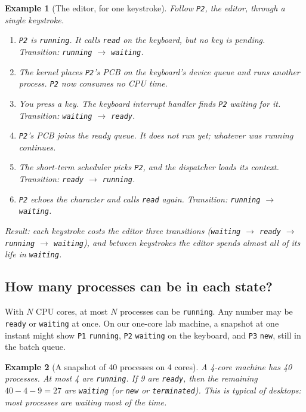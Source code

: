\documentclass[11pt]{article}
\newtheorem{example}{Example}
\begin{document}
\begin{example}[The editor, for one keystroke]
\label{ex:keystroke}
Follow \texttt{P2}, the editor, through a single keystroke.
\begin{enumerate}
  \item \texttt{P2} is \texttt{running}. It calls \texttt{read} on the
        keyboard, but no key is pending. Transition:
        \texttt{running} $\to$ \texttt{waiting}.
  \item The kernel places \texttt{P2}'s PCB on the keyboard's device queue and
        runs another process. \texttt{P2} now consumes no CPU time.
  \item You press a key. The keyboard interrupt handler finds \texttt{P2}
        waiting for it. Transition: \texttt{waiting} $\to$ \texttt{ready}.
  \item \texttt{P2}'s PCB joins the ready queue. It does \emph{not} run yet;
        whatever was running continues.
  \item The short-term scheduler picks \texttt{P2}, and the dispatcher loads
        its context. Transition: \texttt{ready} $\to$ \texttt{running}.
  \item \texttt{P2} echoes the character and calls \texttt{read} again.
        Transition: \texttt{running} $\to$ \texttt{waiting}.
\end{enumerate}
\emph{Result:} each keystroke costs the editor three transitions
(\texttt{waiting} $\to$ \texttt{ready} $\to$ \texttt{running} $\to$
\texttt{waiting}), and between keystrokes the editor spends almost all of its
life in \texttt{waiting}.
\end{example}

\subsection{How many processes can be in each state?}

With $N$ CPU cores, at most $N$ processes can be \texttt{running}. Any number
may be \texttt{ready} or \texttt{waiting} at once. On our one-core lab machine,
a snapshot at one instant might show \texttt{P1} \texttt{running},
\texttt{P2} \texttt{waiting} on the keyboard, and \texttt{P3} \texttt{new},
still in the batch queue.

\begin{example}[A snapshot of 40 processes on 4 cores]
A 4-core machine has 40 processes. At most 4 are \texttt{running}. If 9 are
\texttt{ready}, then the remaining $40 - 4 - 9 = 27$ are \texttt{waiting} (or
\texttt{new} or \texttt{terminated}). This is typical of desktops: most
processes are waiting most of the time.
\end{example}
\end{document}
